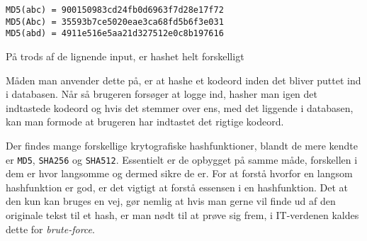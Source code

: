 \documentclass[a4paper, 12pt]{article}
\begin{document}
    \begin{eks}[h]
        \centering
        \texttt{MD5(abc) = 900150983cd24fb0d6963f7d28e17f72}\\
        \texttt{MD5(Abc) = 35593b7ce5020eae3ca68fd5b6f3e031}\\
        \texttt{MD5(abd) = 4911e516e5aa21d327512e0c8b197616}

        \caption{På trods af de lignende input, er hashet helt forskelligt}
        \label{eks:hash}
    \end{eks}


    Måden man anvender dette på, er at hashe et kodeord inden det bliver puttet ind i databasen.
    Når så brugeren forsøger at logge ind, hasher man igen det indtastede kodeord og hvis det stemmer over ens, med det liggende i databasen, kan man formode at brugeren har indtastet det rigtige kodeord.

    Der findes mange forskellige krytografiske hashfunktioner, blandt de mere kendte er \texttt{MD5}, \texttt{SHA256} og \texttt{SHA512}.
    Essentielt er de opbygget på samme måde, forskellen i dem er hvor langsomme og dermed sikre de er.
    For at forstå hvorfor en langsom hashfunktion er god, er det vigtigt at forstå essensen i en hashfunktion.
    Det at den kun kan bruges en vej, gør nemlig at hvis man gerne vil finde ud af den originale tekst til et hash, er man nødt til at prøve sig frem, i IT-verdenen kaldes dette for \emph{brute-force}.
\end{document}

